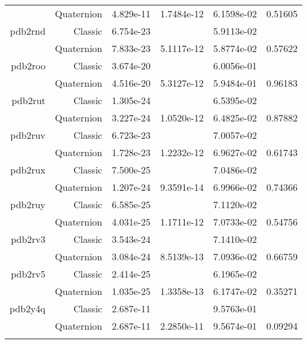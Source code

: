 \begin{xltabular}{\textwidth}{r|rS[table-format=1.3e+2]S[table-format=1.4e+2]S[table-format=1.4e+2]S[table-format=-1.5]}
& Quaternion & 4.829e-11 & 1.7484e-12 & 6.1598e-02 & 0.51605\\  \addlinespace
pdb2rnd & Classic & 6.754e-23 &  & 5.9113e-02 & \\
& Quaternion & 7.833e-23 & 5.1117e-12 & 5.8774e-02 & 0.57622\\  \addlinespace
pdb2roo & Classic & 3.674e-20 &  & 6.0056e-01 & \\
& Quaternion & 4.516e-20 & 5.3127e-12 & 5.9484e-01 & 0.96183\\  \addlinespace
pdb2rut & Classic & 1.305e-24 &  & 6.5395e-02 & \\
& Quaternion & 3.227e-24 & 1.0520e-12 & 6.4825e-02 & 0.87882\\  \addlinespace
pdb2ruv & Classic & 6.723e-23 &  & 7.0057e-02 & \\
& Quaternion & 1.728e-23 & 1.2232e-12 & 6.9627e-02 & 0.61743\\  \addlinespace
pdb2rux & Classic & 7.500e-25 &  & 7.0486e-02 & \\
& Quaternion & 1.207e-24 & 9.3591e-14 & 6.9966e-02 & 0.74366\\  \addlinespace
pdb2ruy & Classic & 6.585e-25 &  & 7.1120e-02 & \\
& Quaternion & 4.031e-25 & 1.1711e-12 & 7.0733e-02 & 0.54756\\  \addlinespace
pdb2rv3 & Classic & 3.543e-24 &  & 7.1410e-02 & \\
& Quaternion & 3.084e-24 & 8.5139e-13 & 7.0936e-02 & 0.66759\\  \addlinespace
pdb2rv5 & Classic & 2.414e-25 &  & 6.1965e-02 & \\
& Quaternion & 1.035e-25 & 1.3358e-13 & 6.1747e-02 & 0.35271\\  \addlinespace
pdb2y4q & Classic & 2.687e-11 &  & 9.5763e-01 & \\
& Quaternion & 2.687e-11 & 2.2850e-11 & 9.5674e-01 & 0.09294\\  \addlinespace
\end{xltabular}
